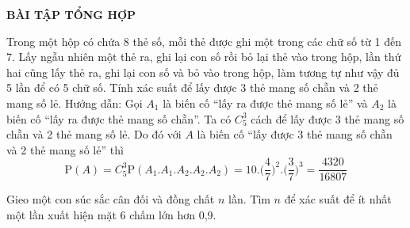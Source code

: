 \begin{center}
	\textbf{BÀI TẬP TỔNG HỢP}
\end{center}
\begin{bt}%
	Trong một hộp có chứa 8 thẻ số, mỗi thẻ được ghi một trong các chữ số từ 1 đến 7. Lấy ngẫu nhiên một thẻ ra, ghi lại con số rồi bỏ lại thẻ vào trong hộp, lần thứ hai cũng lấy thẻ ra, ghi lại con số và bỏ vào trong hộp, làm tương tự như vậy đủ 5 lần để có 5 chữ số. Tính xác suất để lấy được 3 thẻ mang số chẵn và 2 thẻ mang số lẻ.
	\loigiai
	{Hướng dẫn: Gọi $A_1$ là biến cố ``lấy ra được thẻ mang số lẻ'' và $A_2$ là biến cố ``lấy ra được thẻ mang số chẵn''. Ta có $C_5^3$ cách để lấy được 3 thẻ mang số chẵn và 2 thẻ mang số lẻ. Do đó với $A$ là biến cố ``lấy được 3 thẻ mang số chẵn và 2 thẻ mang số lẻ'' thì 
		$$\mathrm{P}(A)=C_5^3 \mathrm{P}(A_1.A_1.A_2.A_2.A_2)=10.\biggl(\dfrac{4}{7}\biggr)^2.\biggl(\dfrac{3}{7}\biggr)^3=\dfrac{4320}{16807}$$
	}
\end{bt}
\begin{bt}%
	Gieo một con súc sắc cân đối và đồng chất $n$ lần. Tìm $n$ để xác suất để ít nhất một lần xuất hiện mặt 6 chấm lớn hơn 0,9.
\end{bt}

